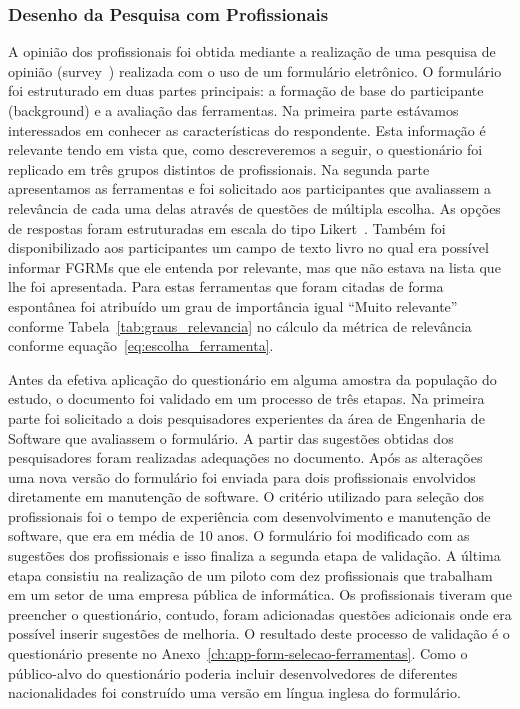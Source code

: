 \subsubsection{Desenho da Pesquisa com Profissionais}
\label{ssub:metodologia_desenho_da_pesquisa_com_profissionais}

A opinião dos profissionais foi obtida mediante a realização de uma pesquisa de
opinião (survey~\cite{wohlin2012experimentation}) realizada com o uso de um
formulário eletrônico. O formulário foi estruturado em duas partes principais: a
formação de base do participante (background) e a avaliação das ferramentas. Na
primeira parte estávamos interessados em conhecer as características do
respondente. Esta informação é relevante tendo em vista que, como descreveremos
a seguir, o questionário foi replicado em três grupos distintos de
profissionais. Na segunda parte apresentamos as ferramentas e foi solicitado aos
participantes que avaliassem a relevância de cada uma delas através de questões
de múltipla escolha. As opções de respostas foram estruturadas em escala do tipo
Likert~\cite{robbins2011plotting}. Também foi disponibilizado aos participantes
um campo de texto livro no qual era possível informar FGRMs que ele entenda por
relevante, mas que não estava na lista que lhe foi apresentada. Para estas
ferramentas que foram citadas de forma espontânea foi atribuído um grau de
importância igual ``Muito relevante'' conforme Tabela~\ref{tab:graus_relevancia}
no cálculo da métrica de relevância conforme
equação~\ref{eq:escolha_ferramenta}.

Antes da efetiva aplicação do questionário em alguma amostra da população do
estudo, o documento foi validado em um processo de três etapas. Na primeira
parte foi solicitado a dois pesquisadores experientes da área de Engenharia de
Software que avaliassem o formulário. A partir das sugestões obtidas dos
pesquisadores foram realizadas adequações no documento. Após as alterações uma
nova versão do formulário foi enviada para dois profissionais envolvidos
diretamente em manutenção de software. O critério utilizado para seleção dos
profissionais foi o tempo de experiência com desenvolvimento e manutenção de
software, que era em média de 10 anos. O formulário foi modificado com as
sugestões dos profissionais e isso finaliza a segunda etapa de validação. A
última etapa consistiu na realização de um piloto com dez profissionais que
trabalham em um setor de uma empresa pública de informática. Os profissionais
tiveram que preencher o questionário, contudo, foram adicionadas questões
adicionais onde era possível inserir sugestões de melhoria. O resultado deste
processo de validação é o questionário presente no
Anexo~\ref{ch:app-form-selecao-ferramentas}. Como o público-alvo do questionário
poderia incluir desenvolvedores de diferentes nacionalidades foi construído uma
versão em língua inglesa do formulário.

